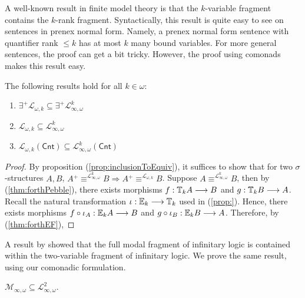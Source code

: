 A well-known result in finite model theory is that the $k$-variable fragment contains the $k$-rank fragment. Syntactically, this result is quite easy to see on sentences in prenex normal form. Namely, a prenex normal form sentence with quantifier rank $\leq k$ has at most $k$ many bound variables. For more general sentences, the proof can get a bit tricky. However, the proof using comonads makes this result easy. 
\begin{prop} The following results hold for all $k \in \omega$:
\begin{enumerate}[label=(\arabic*)]
\item $\exists^{+}\mathcal{L}_{\omega,k} \subseteq \exists^{+}\mathcal{L}^{k}_{\infty,\omega}$
\item $\mathcal{L}_{\omega,k} \subseteq \mathcal{L}^{k}_{\infty,\omega}$
\item $\mathcal{L}_{\omega,k}(\mathsf{Cnt}) \subseteq \mathcal{L}^{k}_{\infty,\omega}(\mathsf{Cnt})$
\end{enumerate}
\begin{proof}
By proposition (\ref{prop:inclusionToEquiv}), it suffices to show that for two $\sigma$-structures $A,B$, $A {}^{+}\equiv^{\mathcal{L}^{k}_{\infty,\omega}} B \Rightarrow A {}^{+}\equiv^{\mathcal{L}_{\omega,k}} B$. Suppose $A \equiv^{\mathcal{L}^{k}_{\infty,\omega}} B$, then by (\ref{thm:forthPebble}), there exists morphisms $f:{\mathbb{T}_{k}A} \longrightarrow B$ and $g:{\mathbb{T}_{k}B} \longrightarrow A$. Recall the natural transformation $\iota:{\mathbb{E}_{k}} \longrightarrow {\mathbb{T}_{k}}$ used in (\ref{prop:}). Hence, there exists morphisms $f \circ \iota_{A}:{\mathbb{E}_{k}A} \longrightarrow B$ and $g \circ \iota_{B}:{\mathbb{E}_{k}B} \longrightarrow A$. Therefore, by (\ref{thm:forthEF}),   
\end{proof}
\end{prop}
A result by \cite{Barwise} showed that the full modal fragment of infinitary logic is contained within the two-variable fragment of infinitary logic. We prove the same result, using our comonadic formulation.
\begin{prop}
$\mathcal{M}_{\infty,\omega} \subseteq \mathcal{L}^{2}_{\infty,\omega}$.
\end{prop}

